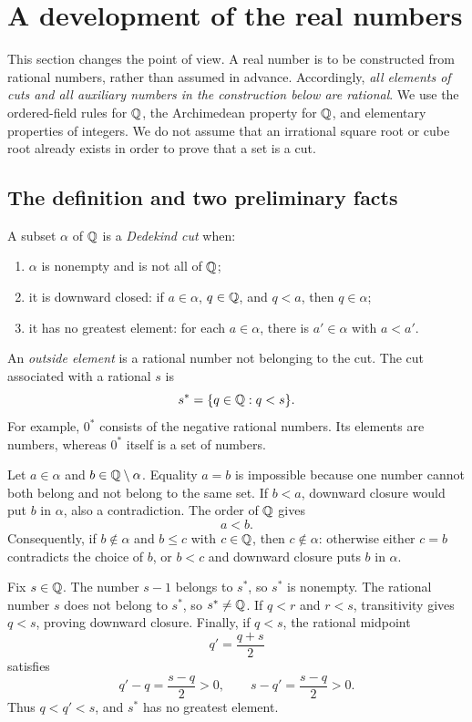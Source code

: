 \section{A development of the real numbers}
\label{sec:dedekind-cuts}

This section changes the point of view. A real number is to be constructed
from rational numbers, rather than assumed in advance. Accordingly,
\emph{all elements of cuts and all auxiliary numbers in the construction
below are rational}. We use the ordered-field rules for $\mathbb{Q}$, the
Archimedean property for $\mathbb{Q}$, and elementary properties of integers.
We do not assume that an irrational square root or cube root already
exists in order to prove that a set is a cut.

\subsection*{The definition and two preliminary facts}
A subset $\alpha$ of $\mathbb{Q}$ is a \emph{Dedekind cut} when:
\begin{enumerate}[label=(\roman*)]
 \item $\alpha$ is nonempty and is not all of $\mathbb{Q}$;
 \item it is downward closed: if $a\in\alpha$, $q\in\mathbb{Q}$, and $q<a$,
       then $q\in\alpha$;
 \item it has no greatest element: for each $a\in\alpha$, there is
       $a'\in\alpha$ with $a<a'$.
\end{enumerate}
An \emph{outside element} is a rational number not belonging to the cut.
The cut associated with a rational $s$ is
\[
 s^*=\{q\in\mathbb{Q}:q<s\}.
\]
For example, $0^*$ consists of the negative rational numbers. Its
elements are numbers, whereas $0^*$ itself is a set of numbers.

Let $a\in\alpha$ and $b\in\mathbb{Q}\setminus\alpha$.
Equality $a=b$ is impossible because one number cannot both belong
and not belong to the same set. If $b<a$, downward closure would
put $b$ in $\alpha$, also a contradiction. The order of $\mathbb{Q}$ gives
\[
 a<b.
\]
Consequently, if $b\notin\alpha$ and $b\le c$ with $c\in\mathbb{Q}$, then
$c\notin\alpha$: otherwise either $c=b$ contradicts the choice of $b$,
or $b<c$ and downward closure puts $b$ in $\alpha$.

Fix $s\in\mathbb{Q}$. The number $s-1$ belongs to $s^*$, so $s^*$ is nonempty.
The rational number $s$ does not belong to $s^*$, so $s^*\ne\mathbb{Q}$.
If $q<r$ and $r<s$, transitivity gives $q<s$, proving downward closure.
Finally, if $q<s$, the rational midpoint
\[
 q'=\frac{q+s}{2}
\]
satisfies
\[
 q'-q=\frac{s-q}{2}>0,\qquad s-q'=\frac{s-q}{2}>0.
\]
Thus $q<q'<s$, and $s^*$ has no greatest element.

